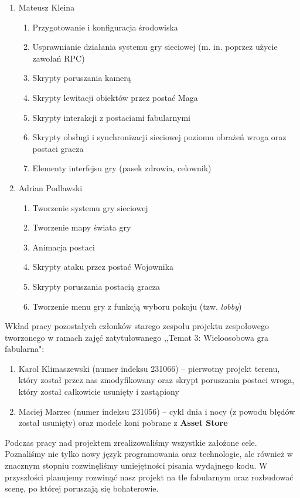 \documentclass[openright]{xmgr}
\newcommand{\name}[1]{\textbf{\textcolor{NavyBlue}{#1}}}
\begin{document}
\begin{enumerate}
\item{Mateusz Kleina}
\begin{enumerate}
\item {Przygotowanie i konfiguracja środowiska}
\item {Usprawnianie działania systemu gry sieciowej (m. in. poprzez użycie zawołań RPC)}
\item {Skrypty poruszania kamerą}
\item {Skrypty lewitacji obiektów przez postać Maga}
\item {Skrypty interakcji z postaciami fabularnymi}
\item {Skrypty obsługi i synchronizacji sieciowej poziomu obrażeń wroga oraz postaci gracza}
\item {Elementy interfejsu gry (pasek zdrowia, celownik)}
\end{enumerate}
\item{Adrian Podlawski}
\begin{enumerate}
\item{Tworzenie systemu gry sieciowej}
\item{Tworzenie mapy świata gry}
\item{Animacja postaci}
\item{Skrypty ataku przez postać Wojownika}
\item{Skrypty poruszania postacią gracza}
\item{Tworzenie menu gry z funkcją wyboru pokoju (tzw. \textit{lobby})}
\end{enumerate}
\end{enumerate}

Wkład pracy pozostałych członków starego zespołu projektu zespołowego tworzonego w ramach zajęć zatytułowanego ,,Temat 3: Wieloosobowa gra fabularna":
\begin{enumerate}
\item{Karol Klimaszewski (numer indeksu 231066) -- pierwotny projekt terenu, który został przez nas zmodyfikowany oraz skrypt poruszania postaci wroga, który został całkowicie usunięty i zastąpiony}
\item{Maciej Marzec (numer indeksu 231056) -- cykl dnia i nocy (z powodu błędów został usunięty) oraz modele koni pobrane z \name{Asset Store}}
\end{enumerate}

\summary
	Podczas pracy nad projektem zrealizowaliśmy wszystkie założone cele.  Poznaliśmy nie tylko nowy język programowania oraz technologie, ale również w znacznym stopniu rozwinęliśmy umiejętności pisania wydajnego kodu. W przyszłości planujemy rozwinąć nasz projekt na tle fabularnym oraz rozbudować scenę, po której poruszają się bohaterowie.
	
\end{document}
